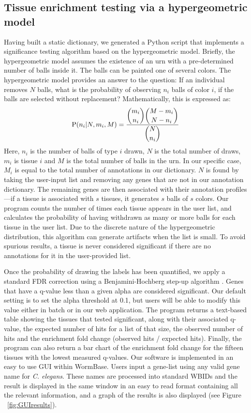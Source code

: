 \documentclass[linenumbers, doublespacing]{bmcart}
\begin{document}
\subsection*{Tissue enrichment testing via a hypergeometric model}
	Having built a static dictionary, we generated a Python script that implements a significance testing algorithm based on the hypergeometric model. Briefly, the hypergeometric model assumes the existence of an urn with a pre-determined number of balls inside it. The balls can be painted one of several colors. The hypergeometric model provides an answer to the question: If an individual removes $N$ balls, what is the probability of observing $n_i$ balls of color $i$, if the balls are selected without replacement? Mathematically, this is expressed as:
\begin{eqnarray}\label{hypergeometric}
	\mathrm{P}(n_i | N, m_i, M) = \frac{\dbinom{m_i}{n_i} \dbinom{M-m_i}{N - n_i}}{\dbinom{N}{n_i}}
\end{eqnarray}
	Here, $n_i$ is the number of balls of type $i$ drawn, $N$ is the total number of draws, $m_i$ is tissue $i$ and $M$ is the total number of balls in the urn. In our specific case, $M_i$ is equal to the total number of annotations in our dictionary. $N$ is found by taking the user-input list and removing any genes that are not in our annotation dictionary. The remaining genes are then associated with their annotation profiles---if a tissue is associated with $s$ tissues, it generates $s$ balls of $s$ colors. Our program counts the number of times each tissue appears in the user list, and calculates the probability of having withdrawn as many or more balls for each tissue in the user list. Due to the discrete nature of the hypergeometric distribution, this algorithm can generate artifacts when the list is small. To avoid spurious results, a tissue is never considered significant if there are no annotations for it in the user-provided list.

	Once the probability of drawing the labels has been quantified, we apply a standard FDR correction using a Benjamini-Hochberg step-up algorithm \cite{Benjamini1995}. Genes that have a q-value less than a given alpha are considered significant. Our default setting is to set the alpha threshold at 0.1, but users will be able to modify this value either in batch or in our web application. The program returns a text-based table showing the tissues that tested significant, along with their associated q-value, the expected number of hits for a list of that size, the observed number of hits and the enrichment fold change (observed hits / expected hits). Finally, the program can also return a bar chart of the enrichment fold change for the fifteen tissues with the lowest measured q-values.
	Our software is implemented in an easy to use GUI within WormBase. Users input a gene-list using any valid gene name for \emph{C. elegans}. These names are processed into standard WBIDs and the result is displayed in the same window in an easy to read format containing all the relevant information, and a graph of the results is also displayed (see Figure ~\ref{fig:GUIresults}).
\end{document}

